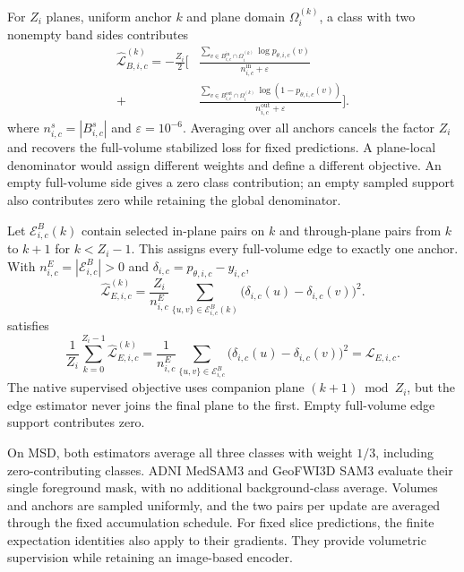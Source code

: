 For $Z_i$ planes, uniform anchor $k$ and plane domain
$\Omega_i^{(k)}$, a class with two nonempty band sides contributes
\begin{equation}
\begin{aligned}
\widehat{\mathcal{L}}_{B,i,c}^{(k)}
=-\frac{Z_i}{2}\Biggl[
 &\frac{\sum_{v\in B_{i,c}^{\mathrm{in}}\cap\Omega_i^{(k)}}
                  \log p_{\theta,i,c}(v)}
        {n_{i,c}^{\mathrm{in}}+\varepsilon}\\
 {}+{}&\frac{\sum_{v\in B_{i,c}^{\mathrm{out}}\cap\Omega_i^{(k)}}
                  \log(1-p_{\theta,i,c}(v))}
        {n_{i,c}^{\mathrm{out}}+\varepsilon}\Biggr].
\end{aligned}
\label{eq:medsam-sampled-band-loss}
\end{equation}
where $n_{i,c}^s=|B_{i,c}^s|$ and $\varepsilon=10^{-6}$.
Averaging over all anchors cancels the factor $Z_i$ and recovers
the full-volume stabilized loss for fixed predictions. A plane-local
denominator would assign different weights and define a different
objective. An empty full-volume side gives a zero class contribution;
an empty sampled support also contributes zero while retaining the
global denominator.

Let $\mathcal E_{i,c}^B(k)$ contain selected in-plane pairs on $k$
and through-plane pairs from $k$ to $k+1$ for $k<Z_i-1$.
This assigns every full-volume edge to exactly one anchor. With
$n_{i,c}^E=|\mathcal E_{i,c}^B|>0$ and
$\delta_{i,c}=p_{\theta,i,c}-y_{i,c}$,
\begin{equation}
\widehat{\mathcal{L}}_{E,i,c}^{(k)}
=\frac{Z_i}{n_{i,c}^E}
  \sum_{\{u,v\}\in\mathcal{E}_{i,c}^B(k)}
    \bigl(\delta_{i,c}(u)-\delta_{i,c}(v)\bigr)^2.
\label{eq:medsam-sampled-edge-loss}
\end{equation}
satisfies
\begin{equation}
\frac{1}{Z_i}\sum_{k=0}^{Z_i-1}
  \widehat{\mathcal{L}}_{E,i,c}^{(k)}
=\frac{1}{n_{i,c}^E}\sum_{\{u,v\}\in\mathcal{E}_{i,c}^B}
    \bigl(\delta_{i,c}(u)-\delta_{i,c}(v)\bigr)^2
=\mathcal{L}_{E,i,c}.
\label{eq:medsam-edge-expectation}
\end{equation}
The native supervised objective uses companion plane
$(k+1)\bmod Z_i$, but the edge estimator never joins the final
plane to the first. Empty full-volume edge support contributes zero.

On MSD, both estimators average all three classes with weight $1/3$,
including zero-contributing classes. ADNI MedSAM3 and GeoFWI3D SAM3
evaluate their single foreground mask, with no additional
background-class average. Volumes and anchors are sampled
uniformly, and the two pairs per update are averaged through the
fixed accumulation schedule. For fixed slice predictions, the finite
expectation identities also apply to their gradients. They provide
volumetric supervision while retaining an image-based encoder.


